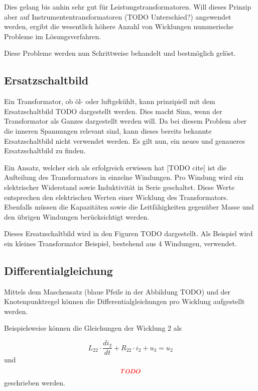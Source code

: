 \begin{refsection}
Dies gelang bis anhin sehr gut für Leistungstransformatoren. Will dieses Prinzip aber auf Instrumententransformatoren (\color{red}TODO\color{black} Unterschied?) angewendet werden, ergibt die wesentlich höhere Anzahl von Wicklungen nummerische Probleme im Lösungsverfahren. 

Diese Probleme werden nun Schrittweise behandelt und bestmöglich gelöst. 


\subsection{Ersatzschaltbild}
Ein Transformator, ob öl- oder luftgekühlt, kann prinzipiell mit dem Ersatzschaltbild \color{red}TODO\color{black} dargestellt werden. Dies macht Sinn, wenn der Transformator als Ganzes dargestellt werden will. Da bei diesem Problem aber die inneren Spannungen relevant sind, kann dieses bereits bekannte Ersatzschaltbild nicht verwendet werden. Es gilt nun, ein neues und genaueres Ersatzschaltbild zu finden. 

Ein Ansatz, welcher sich als erfolgreich erwiesen hat [\color{red}TODO cite\color{black}] ist die Aufteilung des Transformators in einzelne Windungen. Pro Windung wird ein elektrischer Widerstand sowie Induktivität in Serie geschaltet. Diese Werte entsprechen den elektrischen Werten einer Wicklung des Transformators. Ebenfalls müssen die Kapazitäten sowie die Leitfähigkeiten gegenüber Masse und den übrigen Windungen berücksichtigt werden. 

Dieses Ersatzschaltbild wird in den Figuren \color{red}TODO\color{black} dargestellt. Als Beispiel wird ein kleines Transformator Beispiel, bestehend aus 4 Windungen, verwendet. 

\subsection{Differentialgleichung}
Mittels dem Maschensatz (blaue Pfeile in der Abbildung \color{red}TODO\color{black}) und der Knotenpunktregel können die Differentialgleichungen pro Wicklung aufgestellt werden. 

Beispielsweise können die Gleichungen der Wicklung 2 als 

\begin{equation*}
	L_{22} \cdot \frac{di_2}{dt} + R_{22} \cdot i_2 + u_3 = u_2
\end{equation*}
und 
\begin{equation}
	\color{red}TODO
\end{equation}
geschrieben werden. 


\end{refsection}
